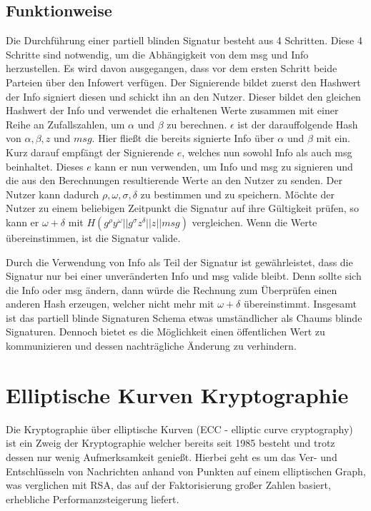 \documentclass[11pt,a4paper]{scrreprt}
\begin{document}
\subsection{Funktionweise}


Die Durchführung einer partiell blinden Signatur besteht aus 4 Schritten. Diese 4 Schritte sind notwendig, um die Abhängigkeit von dem msg und Info herzustellen. Es wird davon ausgegangen, dass vor dem ersten Schritt beide Parteien über den Infowert verfügen. Der Signierende bildet zuerst den Hashwert der Info signiert diesen und schickt ihn an den Nutzer. Dieser bildet den gleichen Hashwert der Info und verwendet die erhaltenen Werte zusammen mit einer Reihe an Zufallszahlen, um $\alpha$ und $\beta$ zu berechnen. $\epsilon$ ist der darauffolgende Hash von $\alpha,\beta,z$ und $msg$. Hier fließt die bereits signierte Info über $\alpha$ und $\beta$ mit ein. Kurz darauf empfängt der Signierende $e$, welches nun sowohl Info als auch msg beinhaltet. Dieses $e$ kann er nun verwenden, um Info und msg zu signieren und die aus den Berechnungen resultierende Werte an den Nutzer zu senden. Der Nutzer kann dadurch $\rho,\omega,\sigma ,\delta$ zu bestimmen und zu speichern. Möchte der Nutzer zu einem beliebigen Zeitpunkt die Signatur auf ihre Gültigkeit prüfen, so kann er $\omega + \delta$ mit  $H (g^\rho y^\omega || g^\sigma z^\delta || z || msg)$ vergleichen. Wenn die Werte übereinstimmen, ist die Signatur valide.

Durch die Verwendung von Info als Teil der Signatur ist gewährleistet, dass die Signatur nur bei einer unveränderten Info und msg valide bleibt. Denn sollte sich die Info oder msg ändern, dann würde die Rechnung zum Überprüfen einen anderen Hash erzeugen, welcher nicht mehr mit $\omega+\delta$ übereinstimmt. Insgesamt ist das partiell blinde Signaturen Schema etwas umständlicher als Chaums blinde Signaturen. Dennoch bietet es die Möglichkeit einen öffentlichen Wert zu kommunizieren und dessen nachträgliche Änderung zu verhindern.


\section{Elliptische Kurven Kryptographie}
\label{sec:ecc}
Die Kryptographie über elliptische Kurven (ECC - elliptic curve cryptography) ist ein Zweig der Kryptographie welcher bereits seit 1985 besteht \cite{ecc-miller1985use} und trotz dessen nur wenig Aufmerksamkeit genießt. Hierbei geht es um das Ver- und Entschlüsseln von Nachrichten anhand von Punkten auf einem elliptischen Graph, was verglichen mit RSA, das auf der Faktorisierung großer Zahlen basiert, erhebliche Performanzsteigerung liefert.
\end{document}
